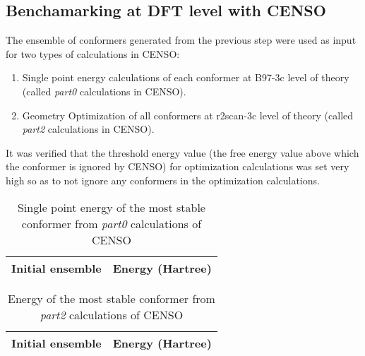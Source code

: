 \subsection{Benchamarking at DFT level with CENSO}
The ensemble of conformers generated from the previous step were used as input for two types of calculations in CENSO:
\begin{enumerate}
    \item Single point energy calculations of each conformer at B97-3c level of theory (called \textit{part0} calculations in CENSO).
    \item Geometry Optimization of all conformers at r2scan-3c level of theory (called \textit{part2} calculations in CENSO).
\end{enumerate}
It was verified that the threshold energy value (the free energy value above which the conformer is ignored by CENSO) for optimization calculations was set very high so as to not ignore any conformers in the optimization calculations. 
\begin{table}[H]
\centering
\begin{tabular}{|c|c|} \hline
\textbf{Initial ensemble} & \textbf{Energy (Hartree)} \\ \hline

\end{tabular}
\caption{Single point energy of the most stable conformer from \textit{part0} calculations of CENSO}
\end{table}
\begin{table}[H]
\centering
\begin{tabular}{|c|c|} \hline
\textbf{Initial ensemble} & \textbf{Energy (Hartree)} \\ \hline

\end{tabular}
\caption{Energy of the most stable conformer from \textit{part2} calculations of CENSO}
\end{table}